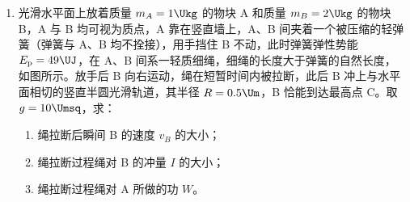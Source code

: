 \documentclass[\gkver]{gaokaozhenti}
\begin{document}
\begin{enumerate}
{（2）粒子在磁场中以 $O'$ 为圆心做匀速圆周运动，半径为 $O'N$，有 $qvB=m\frac{v^{2}}{r}$，得 $r=\frac{2mv_{0}}{qB}$。


（3）由几何关系得 $ON=r\sin\theta$；设粒子在电场中运动的时间为 $t_{1}$，有 $ON=v_{0}t_{1}$，得 $t_{1}=\frac{\sqrt{3}m}{qB}$。粒子在磁场中做匀速圆周运动的周期 $T=\frac{2\pi m}{qB}$，设粒子在磁场中运动的时间为 $t_{2}$，有 $t_{2}=\frac{\pi-\theta}{2\pi}T=\frac{2\pi m}{3qB}$，所以 $t=t_{1}+t_{2}=\frac{(3\sqrt{3}+2\pi)m}{3qB}$。
}

\item
光滑水平面上放着质量 $m_{A}=1\Ukg$ 的物块 A 和质量 $m_{B}=2\Ukg$ 的物块 B，A 与 B 均可视为质点，A 靠在竖直墙上，A、B 间夹着一个被压缩的轻弹簧（弹簧与 A、B 均不拴接），用手挡住 B 不动，此时弹簧弹性势能 $E_{\text{p}}=49\UJ$，在 A、B 间系一轻质细绳，细绳的长度大于弹簧的自然长度，如图所示。放手后 B 向右运动，绳在短暂时间内被拉断，此后 B 冲上与水平面相切的竖直半圆光滑轨道，其半径 $R=0.5\Um$，B 恰能到达最高点 C。取 $g=10\Umsq$，求：

\begin{enumerate}
	\item
	绳拉断后瞬间 B 的速度 $v_{B}$ 的大小；
	\item
	绳拉断过程绳对 B 的冲量 $I$ 的大小；
	\item
	绳拉断过程绳对 A 所做的功 $W$。
\end{enumerate}



\end{enumerate}
\end{document}
